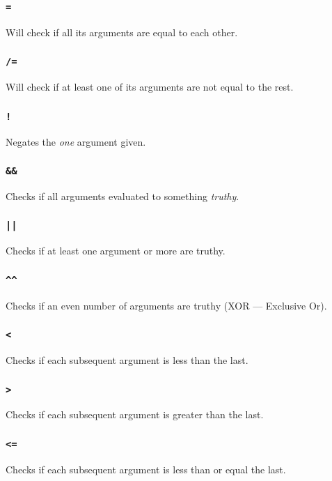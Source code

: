 \documentclass{article}
\newcommand{\code}[1]{\texttt{#1}}
\begin{document}
    \subsubsection{\code{=}}
      Will check if all its arguments are equal to each other.

    \subsubsection{\code{/=}}
      Will check if at least one of its arguments are not equal
      to the rest.

    \subsubsection{\code{!}}
      Negates the \emph{one} argument given.

    \subsubsection{\code{\&\&}}
       Checks if all arguments evaluated to something \emph{truthy}.

    \subsubsection{\code{||}}
      Checks if at least one argument or more are truthy.

    \subsubsection{\code{\^{}\^{}}}
      Checks if an even number of arguments are truthy (XOR --- Exclusive Or).

    \subsubsection{\code{<}}
      Checks if each subsequent argument is less than the last.

    \subsubsection{\code{>}}
      Checks if each subsequent argument is greater than the last.

    \subsubsection{\code{<=}}
      Checks if each subsequent argument is less than or equal the last.
\end{document}
